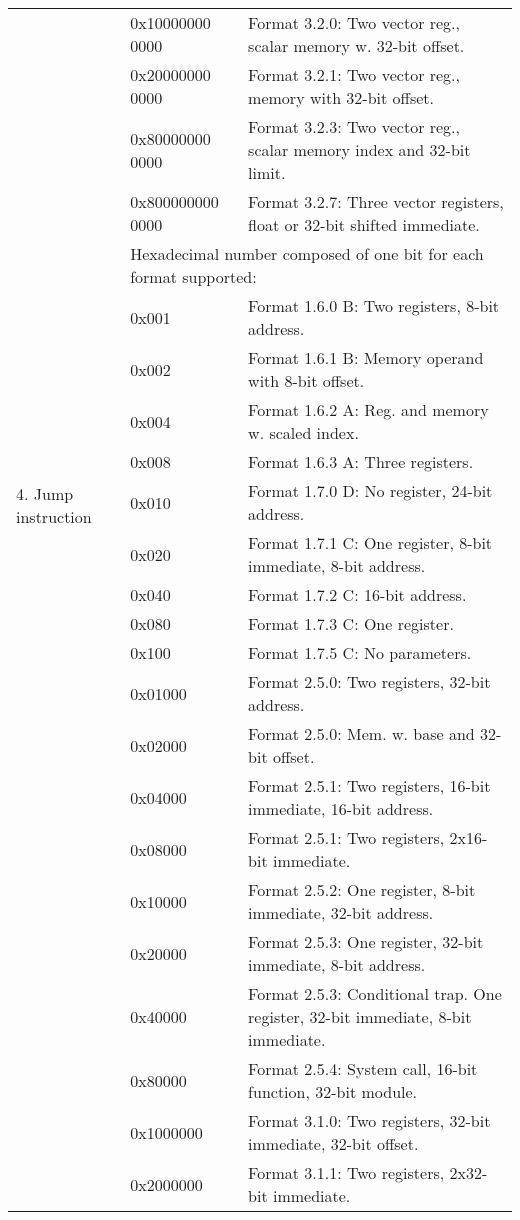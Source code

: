\documentclass[forwardcom.tex]{subfiles}
\begin{document}
\begin{longtable} {|p{18mm}|p{20mm} p{80mm}|}
  &  0x10000000 0000 & Format 3.2.0: Two vector reg., scalar memory w. 32-bit offset. \\
  &  0x20000000 0000 & Format 3.2.1: Two vector reg., memory with 32-bit offset. \\
  &  0x80000000 0000 & Format 3.2.3: Two vector reg., scalar memory index and 32-bit limit. \\
  & 0x800000000 0000 & Format 3.2.7: Three vector registers, float or 32-bit shifted immediate.\\

\hline

\multirow{12}{*}{\parbox[t]{18mm}{4. Jump instruction}} 
  &  \multicolumn{2}{|l|}{
     Hexadecimal number composed of one bit for each format supported:} \\
  &  0x001 & Format 1.6.0 B: Two registers, 8-bit address. \\
  &  0x002 & Format 1.6.1 B: Memory operand with 8-bit offset. \\
  &  0x004 & Format 1.6.2 A: Reg. and memory w. scaled index. \\
  &  0x008 & Format 1.6.3 A: Three registers. \\
  
  &  0x010 & Format 1.7.0 D: No register, 24-bit address. \\  
  &  0x020 & Format 1.7.1 C: One register, 8-bit immediate, 8-bit address. \\
  &  0x040 & Format 1.7.2 C: 16-bit address. \\
  &  0x080 & Format 1.7.3 C: One register. \\
  &  0x100 & Format 1.7.5 C: No parameters. \\
  
  &  0x01000 & Format 2.5.0: Two registers, 32-bit address. \\
  &  0x02000 & Format 2.5.0: Mem. w. base and 32-bit offset. \\
  &  0x04000 & Format 2.5.1: Two registers, 16-bit immediate, 16-bit address. \\
  &  0x08000 & Format 2.5.1: Two registers, 2x16-bit immediate. \\

  &  0x10000 & Format 2.5.2: One register, 8-bit immediate, 32-bit address. \\
  &  0x20000 & Format 2.5.3: One register, 32-bit immediate, 8-bit address. \\
  &  0x40000 & Format 2.5.3: Conditional trap. One register, 32-bit immediate, 8-bit immediate. \\  
  &  0x80000 & Format 2.5.4: System call, 16-bit function, 32-bit module. \\
  
  & 0x1000000 & Format 3.1.0: Two registers, 32-bit immediate, 32-bit offset. \\
  & 0x2000000 & Format 3.1.1: Two registers, 2x32-bit immediate. \\
\hline
\end{longtable}
\end{document}
